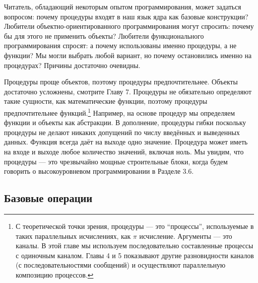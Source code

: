 Читатель, обладающий некоторым опытом программирования, может задаться вопросом: почему процедуры входят в наш язык ядра как базовые конструкции? Любители объектно-ориентированного программирования могут спросить: почему бы для этого не применить объекты? Любители функционального программирования спросят: а почему использованы именно процедуры, а не функции? Мы могли выбрать любой вариант, но почему остановились именно на процедурах? Причины достаточно очевидны.

Процедуры проще объектов, поэтому процедуры предпочтительнее. Объекты достаточно усложнены, смотрите Главу 7. Процедуры не обязательно определяют такие сущности, как математические функции, поэтому процедуры предпочтительнее функций.\footnote{С теоретической точки зрения, процедуры --- это ``процессы'', используемые в таких параллельных исчислениях, как $\pi$ исчисление. Аргументы --- это каналы. В этой главе мы используем последовательно составленные процессы с одиночным каналом. Главы 4 и 5 показывают другие разновидности каналов (с последовательностями сообщений) и осуществляют параллельную композицию процессов.} Например, на основе процедур мы определяем функции и объекты как абстракции. В дополнение, процедуры гибки поскольку процедуры не делают никаких допущений по числу введённых и выведенных данных. Функция всегда даёт на выходе одно значение. Процедура может иметь на входе и выходе любое количество значений, включая ноль. Мы увидим, что процедуры --- это чрезвычайно мощные строительные блоки, когда будем говорить о высокоуровневом программировании в Разделе 3.6.

\subsection{Базовые операции}

